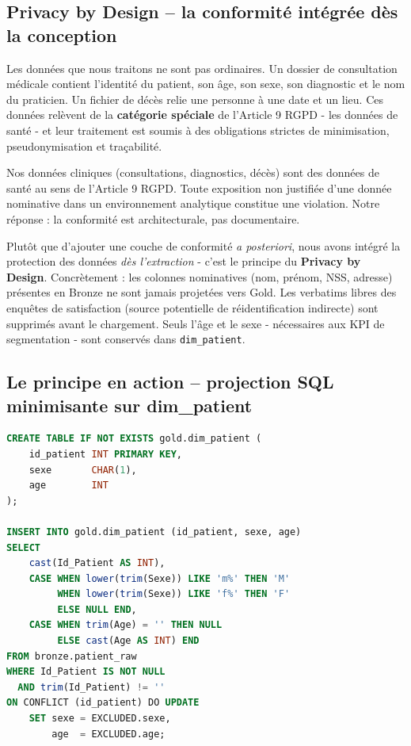 \documentclass[12pt,a4paper]{report}
\begin{document}
\subsection{Privacy by Design -- la conformité intégrée dès la conception}
Les données que nous traitons ne sont pas ordinaires. Un dossier de consultation médicale contient l'identité du patient, son âge, son sexe, son diagnostic et le nom du praticien. Un fichier de décès relie une personne à une date et un lieu. Ces données relèvent de la \textbf{catégorie spéciale} de l'Article 9 RGPD - les données de santé - et leur traitement est soumis à des obligations strictes de minimisation, pseudonymisation et traçabilité.

\begin{warningbox}
Nos données cliniques (consultations, diagnostics, décès) sont des données de santé au sens de l'Article 9 RGPD. Toute exposition non justifiée d'une donnée nominative dans un environnement analytique constitue une violation. Notre réponse : la conformité est architecturale, pas documentaire.
\end{warningbox}

Plutôt que d'ajouter une couche de conformité \textit{a posteriori}, nous avons intégré la protection des données \textit{dès l'extraction} - c'est le principe du \textbf{Privacy by Design}. Concrètement : les colonnes nominatives (nom, prénom, NSS, adresse) présentes en Bronze ne sont jamais projetées vers Gold. Les verbatims libres des enquêtes de satisfaction (source potentielle de réidentification indirecte) sont supprimés avant le chargement. Seuls l'âge et le sexe - nécessaires aux KPI de segmentation - sont conservés dans \texttt{dim\_patient}.

\subsection{Le principe en action -- projection SQL minimisante sur dim\_patient}

\begin{lstlisting}[language=SQL, caption=Filtre de minimisation RGPD -- dim\_patient (conservation age et sexe uniquement)]
CREATE TABLE IF NOT EXISTS gold.dim_patient (
    id_patient INT PRIMARY KEY,
    sexe       CHAR(1),
    age        INT
);

INSERT INTO gold.dim_patient (id_patient, sexe, age)
SELECT
    cast(Id_Patient AS INT),
    CASE WHEN lower(trim(Sexe)) LIKE 'm%' THEN 'M'
         WHEN lower(trim(Sexe)) LIKE 'f%' THEN 'F'
         ELSE NULL END,
    CASE WHEN trim(Age) = '' THEN NULL
         ELSE cast(Age AS INT) END
FROM bronze.patient_raw
WHERE Id_Patient IS NOT NULL
  AND trim(Id_Patient) != ''
ON CONFLICT (id_patient) DO UPDATE
    SET sexe = EXCLUDED.sexe,
        age  = EXCLUDED.age;
\end{lstlisting}
\end{document}
